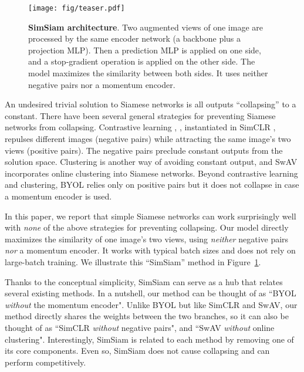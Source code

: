 \documentclass[final]{cvpr}
\begin{document}
\begin{figure}[t]
\centering
\vspace{-1em}
\texttt{[image: fig/teaser.pdf]}
\vspace{-.5em}
\caption{
\textbf{SimSiam architecture}. Two augmented views of one image are processed by the same encoder network  (a backbone plus a projection MLP). Then a prediction MLP  is applied on one side, and a stop-gradient operation is applied on the other side. The model maximizes the similarity between both sides.
It uses neither negative pairs nor a momentum encoder.
\label{fig:teaser}
\vspace{-.5em}
}
\end{figure}


An undesired trivial solution to Siamese networks is all outputs ``collapsing'' to a constant. 
There have been several general strategies for preventing Siamese networks from collapsing.
Contrastive learning \cite{Hadsell2006}, \eg, instantiated in SimCLR \cite{Chen2020}, repulses different images (negative pairs) while attracting the same image's two views (positive pairs).
The negative pairs preclude constant outputs from the solution space. 
Clustering \cite{Caron2018} is another way of avoiding constant output, and SwAV \cite{Caron2020} incorporates online clustering into Siamese networks.
Beyond contrastive learning and clustering, BYOL \cite{Grill2020} relies only on positive pairs but it does not collapse in case a momentum encoder is used.

In this paper, we report that simple Siamese networks can work surprisingly well with \emph{none} of the above strategies for preventing collapsing. 
Our model directly maximizes the similarity of one image's two views, using \emph{neither} negative pairs \emph{nor} a momentum encoder. It works with typical batch sizes and does not rely on large-batch training.
We illustrate this ``SimSiam'' method in Figure~\ref{fig:teaser}.

Thanks to the conceptual simplicity, SimSiam can serve as a hub that relates several existing methods.
In a nutshell, our method can be thought of as ``BYOL \emph{without} the momentum encoder". Unlike BYOL but like SimCLR and SwAV, our method directly shares the weights between the two branches, so it can also be thought of as ``SimCLR \emph{\mbox{without}} negative pairs", and ``SwAV \emph{without} online clustering". Interestingly, SimSiam is related to each method by removing one of its core components. Even so, SimSiam does not cause collapsing and can perform competitively.
\end{document}
